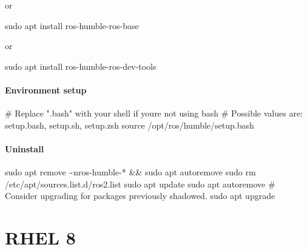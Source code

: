 \documentclass[
  letterpaper,
  DIV=11,
  numbers=noendperiod]{scrreprt}
\newenvironment{Shaded}{\begin{snugshade}}{\end{snugshade}}
\newcommand{\BuiltInTok}[1]{\textcolor[rgb]{0.00,0.23,0.31}{#1}}
\newcommand{\CommentTok}[1]{\textcolor[rgb]{0.37,0.37,0.37}{#1}}
\newcommand{\FunctionTok}[1]{\textcolor[rgb]{0.28,0.35,0.67}{#1}}
\newcommand{\KeywordTok}[1]{\textcolor[rgb]{0.00,0.23,0.31}{#1}}
\newcommand{\NormalTok}[1]{\textcolor[rgb]{0.00,0.23,0.31}{#1}}
\newcommand{\PreprocessorTok}[1]{\textcolor[rgb]{0.68,0.00,0.00}{#1}}
\begin{document}
or

\begin{Shaded}
\begin{Highlighting}[]
\FunctionTok{sudo}\NormalTok{ apt install ros{-}humble{-}ros{-}base}
\end{Highlighting}
\end{Shaded}

or

\begin{Shaded}
\begin{Highlighting}[]
\FunctionTok{sudo}\NormalTok{ apt install ros{-}humble{-}ros{-}dev{-}tools}
\end{Highlighting}
\end{Shaded}

\hypertarget{environment-setup}{%
\subsubsection{Environment setup}\label{environment-setup}}

\begin{Shaded}
\begin{Highlighting}[]
\CommentTok{\# Replace ".bash" with your shell if you\textquotesingle{}re not using bash}
\CommentTok{\# Possible values are: setup.bash, setup.sh, setup.zsh}
\BuiltInTok{source}\NormalTok{ /opt/ros/humble/setup.bash}
\end{Highlighting}
\end{Shaded}

\hypertarget{uninstall}{%
\subsubsection{Uninstall}\label{uninstall}}

\begin{Shaded}
\begin{Highlighting}[]
\FunctionTok{sudo}\NormalTok{ apt remove \textasciitilde{}nros{-}humble{-}}\PreprocessorTok{*} \KeywordTok{\&\&} \FunctionTok{sudo}\NormalTok{ apt autoremove}
\FunctionTok{sudo}\NormalTok{ rm /etc/apt/sources.list.d/ros2.list}
\FunctionTok{sudo}\NormalTok{ apt update}
\FunctionTok{sudo}\NormalTok{ apt autoremove}
\CommentTok{\# Consider upgrading for packages previously shadowed.}
\FunctionTok{sudo}\NormalTok{ apt upgrade}
\end{Highlighting}
\end{Shaded}


\hypertarget{sec-rhel-8}{%
\chapter{RHEL 8}\label{sec-rhel-8}}
\end{document}
